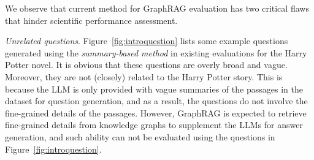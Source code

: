 


We observe that current method for GraphRAG evaluation has two critical flaws that hinder scientific performance assessment. 
\squishlist
\item \textit{Unrelated questions}. Figure~\ref{fig:introquestion} lists some example questions generated using the \textit{summary-based method} in existing evaluations for the Harry Potter novel. It is obvious that these questions are overly broad and vague. Moreover, they are not (closely) related to the Harry Potter story. This is because the LLM is only provided with vague summaries of the passages in the dataset for question generation, and as a result, the questions do not involve the fine-grained details of the passages. However, GraphRAG is expected to retrieve fine-grained details from knowledge graphs to supplement the LLMs for answer generation, and such ability can not be evaluated using the questions in Figure~\ref{fig:introquestion}.   


